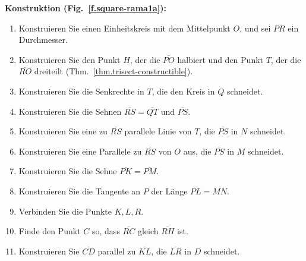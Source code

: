 \textbf{Konstruktion (Fig.~\ref{f.square-rama1a}):}
\begin{enumerate}

\item Konstruieren Sie einen Einheitskreis mit dem Mittelpunkt $O$, und sei $\overline{PR}$ ein Durchmesser.

\item Konstruieren Sie den Punkt $H$, der die $\overline{PO}$ halbiert und den Punkt $T$, der die $\overline{RO}$ dreiteilt (Thm.~\ref{thm.trisect-constructible}).

\item Konstruieren Sie die Senkrechte in $T$, die den Kreis in $Q$ schneidet.

\item Konstruieren Sie die Sehnen $\overline{RS}=\overline{QT}$ und $\overline{PS}$.

\item Konstruieren Sie eine zu $\overline{RS}$ parallele Linie von $T$, die $\overline{PS}$ in $N$ schneidet.

\item Konstruieren Sie eine Parallele zu $\overline{RS}$ von $O$ aus, die $\overline{PS}$ in $M$ schneidet.

\item Konstruieren Sie die Sehne $\overline{PK}=\overline{PM}$.

\item Konstruieren Sie die Tangente an $P$ der Länge $\overline{PL}=\overline{MN}$.

\item Verbinden Sie die Punkte $K,L,R$.

\item Finde den Punkt $C$ so, dass $\overline{RC}$ gleich $\overline{RH}$ ist.

\item Konstruieren Sie $\overline{CD}$ parallel zu $\overline{KL}$, die $\overline{LR}$ in $D$ schneidet. 
\end{enumerate}

